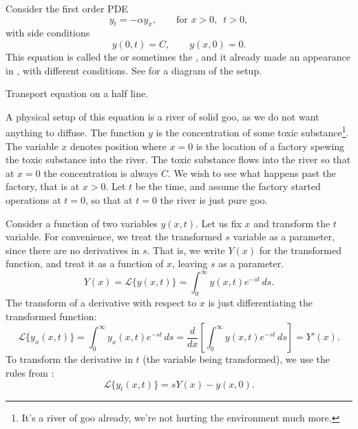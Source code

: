 \begin{example}
Consider the first order PDE
\begin{equation*}
y_t = - \alpha y_x, \qquad \text{for } x > 0, \enspace t > 0,
\end{equation*}
with side conditions
\begin{equation*}
y(0,t) = C, \qquad y(x,0) = 0 .
\end{equation*}
This equation is 
called the \emph{} or sometimes
the \emph{}, and it already made
an appearance in , with different conditions.
See  for a diagram of the setup.

\begin{mywrapfig}{3.1in}
\capstart
{}
\caption{Transport equation on a half line.\label{lt:half-infinite-goo-river}}
\end{mywrapfig}

A physical setup of this equation is a river of solid goo,
as we do not want anything to diffuse.  The function
$y$ is the concentration of
some toxic substance\footnote{It's a river of goo already,
we're not hurting the environment much more.}.
The variable $x$ denotes position where $x=0$
is the location of a factory spewing the toxic substance into the
river.  The toxic substance flows into the river so that at $x=0$ the
concentration is always $C$.  We wish to see what happens past the factory,
that is at $x > 0$.  Let $t$ be the time, and assume
the factory started operations at $t=0$, so that at $t=0$ the river is just
pure goo.

Consider a function of two variables $y(x,t)$.
Let us fix $x$ and transform the $t$ variable.
For convenience, we treat the transformed $s$
variable as a parameter, since there are no derivatives in $s$.
That is, we write $Y(x)$ for the transformed function,
and treat it as a function of $x$, leaving $s$ as a parameter.
\begin{equation*}
Y(x)
= {\mathcal L} \bigl\{ y(x,t) \bigr\}
= \int_0^\infty y(x,t) e^{-st} \,ds .
\end{equation*}
The transform of a derivative with respect to $x$ is just differentiating 
the transformed function:
\begin{equation*}
{\mathcal L} \bigl\{ y_x(x,t) \bigr\} =
\int_0^\infty y_x(x,t) e^{-st} \,ds
=
\frac{d}{dx} \left[\int_0^\infty y(x,t) e^{-st} \,ds \right]
=
Y'(x) .
\end{equation*}
To transform the derivative in $t$ (the variable being transformed),
we use the rules from :
\begin{equation*}
{\mathcal L} \bigl\{ y_t(x,t) \bigr\} 
=
sY(x) - y(x,0) .
\end{equation*}


\end{example}
